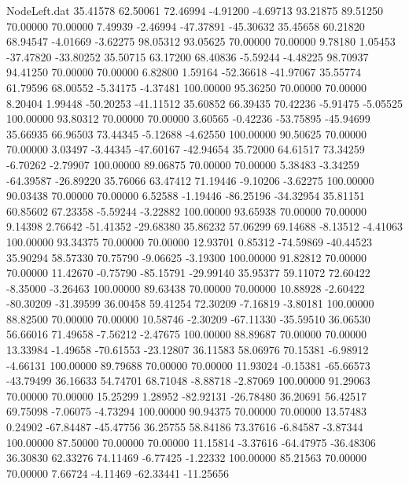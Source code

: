 \begin{filecontents}{NodeLeft.dat}
  35.41578   62.50061   72.46994    -4.91200   -4.69713   93.21875   89.51250   70.00000   70.00000    7.49939   -2.46994  -47.37891  -45.30632
  35.45658   60.21820   68.94547    -4.01669   -3.62275   98.05312   93.05625   70.00000   70.00000    9.78180    1.05453  -37.47820  -33.80252
  35.50715   63.17200   68.40836    -5.59244   -4.48225   98.70937   94.41250   70.00000   70.00000    6.82800    1.59164  -52.36618  -41.97067
  35.55774   61.79596   68.00552    -5.34175   -4.37481  100.00000   95.36250   70.00000   70.00000    8.20404    1.99448  -50.20253  -41.11512
  35.60852   66.39435   70.42236    -5.91475   -5.05525  100.00000   93.80312   70.00000   70.00000    3.60565   -0.42236  -53.75895  -45.94699
  35.66935   66.96503   73.44345    -5.12688   -4.62550  100.00000   90.50625   70.00000   70.00000    3.03497   -3.44345  -47.60167  -42.94654
  35.72000   64.61517   73.34259    -6.70262   -2.79907  100.00000   89.06875   70.00000   70.00000    5.38483   -3.34259  -64.39587  -26.89220
  35.76066   63.47412   71.19446    -9.10206   -3.62275  100.00000   90.03438   70.00000   70.00000    6.52588   -1.19446  -86.25196  -34.32954
  35.81151   60.85602   67.23358    -5.59244   -3.22882  100.00000   93.65938   70.00000   70.00000    9.14398    2.76642  -51.41352  -29.68380
  35.86232   57.06299   69.14688    -8.13512   -4.41063  100.00000   93.34375   70.00000   70.00000   12.93701    0.85312  -74.59869  -40.44523
  35.90294   58.57330   70.75790    -9.06625   -3.19300  100.00000   91.82812   70.00000   70.00000   11.42670   -0.75790  -85.15791  -29.99140
  35.95377   59.11072   72.60422    -8.35000   -3.26463  100.00000   89.63438   70.00000   70.00000   10.88928   -2.60422  -80.30209  -31.39599
  36.00458   59.41254   72.30209    -7.16819   -3.80181  100.00000   88.82500   70.00000   70.00000   10.58746   -2.30209  -67.11330  -35.59510
  36.06530   56.66016   71.49658    -7.56212   -2.47675  100.00000   88.89687   70.00000   70.00000   13.33984   -1.49658  -70.61553  -23.12807
  36.11583   58.06976   70.15381    -6.98912   -4.66131  100.00000   89.79688   70.00000   70.00000   11.93024   -0.15381  -65.66573  -43.79499
  36.16633   54.74701   68.71048    -8.88718   -2.87069  100.00000   91.29063   70.00000   70.00000   15.25299    1.28952  -82.92131  -26.78480
  36.20691   56.42517   69.75098    -7.06075   -4.73294  100.00000   90.94375   70.00000   70.00000   13.57483    0.24902  -67.84487  -45.47756
  36.25755   58.84186   73.37616    -6.84587   -3.87344  100.00000   87.50000   70.00000   70.00000   11.15814   -3.37616  -64.47975  -36.48306
  36.30830   62.33276   74.11469    -6.77425   -1.22332  100.00000   85.21563   70.00000   70.00000    7.66724   -4.11469  -62.33441  -11.25656

\end{filecontents}
